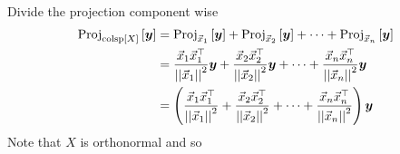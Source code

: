 \documentclass[12pt]{article}
\begin{document}
\begin{enumerate}
 \\
Divide the projection component wise
 $$ \begin{aligned} \text{Proj}_{\text{colsp}\left[X\right]}\left[\boldsymbol{y}\right] &= \text{Proj}_{\vec{x}_1}\left[\boldsymbol{y}\right] + \text{Proj}_{\vec{x}_2}\left[\boldsymbol{y}\right] + \dots + \text{Proj}_{\vec{x}_n}\left[\boldsymbol{y}\right] \\ &= \frac{\vec{x}_1\vec{x}_1^\top}{\left|\left|\vec{x}_1\right|\right|^2}\boldsymbol{y} + \frac{\vec{x}_2\vec{x}_2^\top}{\left|\left|\vec{x}_2\right|\right|^2}\boldsymbol{y} + \dots + \frac{\vec{x}_n\vec{x}_n^\top}{\left|\left|\vec{x}_n\right|\right|^2}\boldsymbol{y} \\ &= \left( \frac{\vec{x}_1\vec{x}_1^\top}{\left|\left|\vec{x}_1\right|\right|^2} + \frac{\vec{x}_2\vec{x}_2^\top}{\left|\left|\vec{x}_2\right|\right|^2} + \dots + \frac{\vec{x}_n\vec{x}_n^\top}{\left|\left|\vec{x}_n\right|\right|^2}\right)\boldsymbol{y} \end{aligned} $$ 
Note that $X$ is orthonormal and so 

\end{enumerate}
\end{document}
